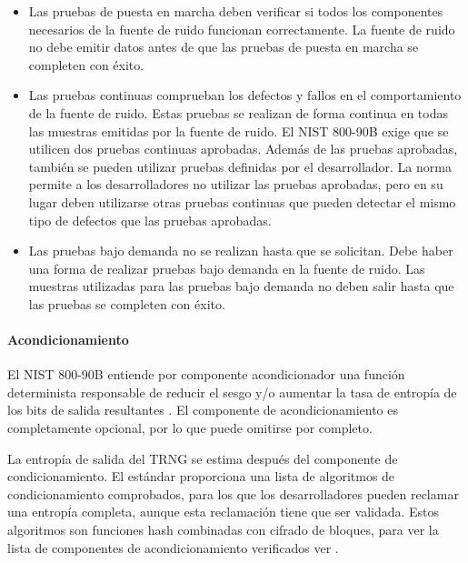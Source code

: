             \begin{itemize}[noitemsep]
                \item Las pruebas de puesta en marcha deben verificar si todos los componentes necesarios de la fuente de ruido funcionan correctamente. La fuente de ruido no debe emitir datos antes de que las pruebas de puesta en marcha se completen con éxito.
                \item Las pruebas continuas comprueban los defectos y fallos en el comportamiento de la fuente de ruido. Estas pruebas se realizan de forma continua en todas las muestras emitidas por la fuente de ruido. El NIST 800-90B exige que se utilicen dos pruebas continuas aprobadas. Además de las pruebas aprobadas, también se pueden utilizar pruebas definidas por el desarrollador. La norma permite a los desarrolladores no utilizar las pruebas aprobadas, pero en su lugar deben utilizarse otras pruebas continuas que pueden detectar el mismo tipo de defectos que las pruebas aprobadas.
                \item Las pruebas bajo demanda no se realizan hasta que se solicitan. Debe haber una forma de realizar pruebas bajo demanda en la fuente de ruido. Las muestras utilizadas para las pruebas bajo demanda no deben salir hasta que las pruebas se completen con éxito.
            \end{itemize}
            
            \paragraph{Acondicionamiento\\}
            
            El NIST 800-90B entiende por componente acondicionador una función determinista responsable de reducir el sesgo y/o aumentar la tasa de entropía de los bits de salida resultantes \cite{Turan2018}. El componente de acondicionamiento es completamente opcional, por lo que puede omitirse por completo.
            
            La entropía de salida del TRNG se estima después del componente de condicionamiento. El estándar proporciona una lista de algoritmos de condicionamiento comprobados, para los que los desarrolladores pueden reclamar una entropía completa, aunque esta reclamación tiene que ser validada. Estos algoritmos son funciones hash combinadas con cifrado de bloques, para ver la lista de componentes de acondicionamiento verificados ver \cite{Turan2018}.
            
